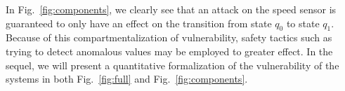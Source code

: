 In Fig.~\ref{fig:components}, we clearly see that an attack on the speed sensor is guaranteed to only have an effect on the transition from state $q_0$ to state $q_1$.
Because of this compartmentalization of vulnerability, safety tactics such as trying to detect anomalous values may be employed to greater effect.
In the sequel, we will present a quantitative formalization of the vulnerability of the systems in both Fig.~\ref{fig:full} and Fig.~\ref{fig:components}.
